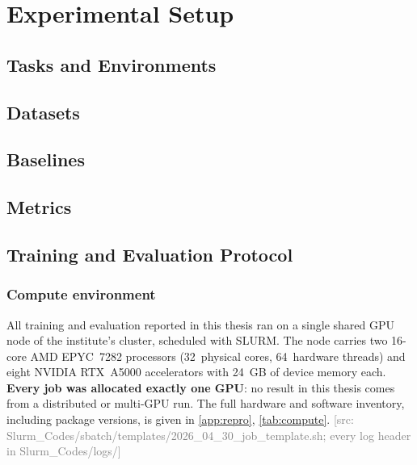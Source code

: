 \documentclass[headsepline,footsepline,footinclude=false,oneside,fontsize=11pt,paper=a4,listof=totoc,bibliography=totoc]{scrbook}
\theoremstyle{definition}
\theoremstyle{plain}
\theoremstyle{remark}
\newif\ifsubmission
\newcommand{\srcnote}[1]{\ifsubmission\else\textcolor{gray}{\footnotesize\textsf{[src: #1]}}\fi}
\begin{document}
\chapter{Experimental Setup}\label{ch:setup}
\section{Tasks and Environments}\label{sec:setup:tasks}
\section{Datasets}\label{sec:setup:data}
\section{Baselines}\label{sec:setup:baselines}
\section{Metrics}\label{sec:setup:metrics}
\section{Training and Evaluation Protocol}\label{sec:setup:protocol}


\subsection*{Compute environment}

All training and evaluation reported in this thesis ran on a single shared GPU node of the
institute's cluster, scheduled with SLURM. The node carries two 16-core AMD EPYC~7282 processors
(32~physical cores, 64~hardware threads) and eight NVIDIA RTX~A5000 accelerators with 24~GB of
device memory each. \textbf{Every job was allocated exactly one GPU}: no result in this thesis comes
from a distributed or multi-GPU run. The full hardware and software inventory, including package
versions, is given in \autoref{app:repro}, \autoref{tab:compute}.
\srcnote{Slurm\_Codes/sbatch/templates/2026\_04\_30\_job\_template.sh; every log header in Slurm\_Codes/logs/}
\end{document}
